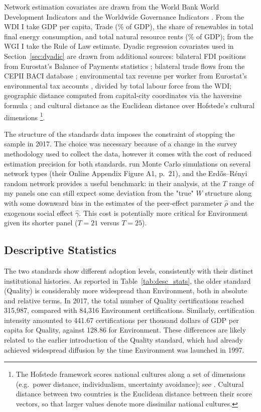 \documentclass[12pt,a4paper]{article}
\begin{document}
Network estimation covariates are drawn from the World Bank World Development Indicators \citep{WDI} and the
Worldwide Governance Indicators \citep{WGI}. From the WDI I take GDP per capita, Trade (\% of GDP),
the share of renewables in total final energy consumption, and total natural resource rents
(\% of GDP); from the WGI I take the Rule of Law estimate.
Dyadic regression covariates used in Section~\ref{sec:dyadic} are drawn from additional sources:
bilateral FDI positions from Eurostat's Balance of Payments statistics \citep{EurostatBOP};
bilateral trade flows from the CEPII BACI database \citep{BACI}; environmental tax revenue
per worker from Eurostat's environmental tax accounts \citep{EurostatENV}, divided by total
labour force from the WDI; geographic distance computed from capital-city coordinates via
the haversine formula \citep{mapsR}; and cultural distance as the Euclidean distance over
Hofstede's cultural dimensions \citep{hofstede2001, hofstede2015data}\footnote{The Hofstede framework scores national cultures along a set of dimensions (e.g.\ power distance, individualism, uncertainty avoidance); see \citet{hofstede2001}. Cultural distance between two countries is the Euclidean distance between their score vectors, so that larger values denote more dissimilar national cultures.}.

The structure of the standards data imposes the constraint of stopping the sample in 2017. The choice was necessary because of a change in the survey methodology used to collect the data, however it comes with the cost of reduced estimation precision for both standards. \citet{depaula2025} run Monte Carlo simulations on several network types (their Online Appendix Figure A1, p.~21), and the Erd\H{o}s--R\'{e}nyi random network provides a useful benchmark: in their analysis, at the $T$ range of my panels one can still expect some deviation from the "true" $W$ structure along with some downward bias in the estimates of the peer-effect parameter $\hat{\rho}$ and the exogenous social effect $\hat{\gamma}$. This cost is potentially more critical for Environment given its shorter panel ($T = 21$ versus $T = 25$).
\subsection{Descriptive Statistics}
The two standards show different adoption levels, consistently with their distinct institutional histories. As reported in Table~\ref{tab:desc_stats}, the older standard (Quality) is considerably more widespread than Environment, both in absolute and relative terms. In 2017, the total number of Quality certifications reached 315,987, compared with 84,316 Environment certifications. Similarly, certification intensity amounted to 441.67 certifications per thousand dollars of GDP per capita for Quality, against 128.86 for Environment. These differences are likely related to the earlier introduction of the Quality standard, which had already achieved widespread diffusion by the time Environment was launched in 1997.
\end{document}

